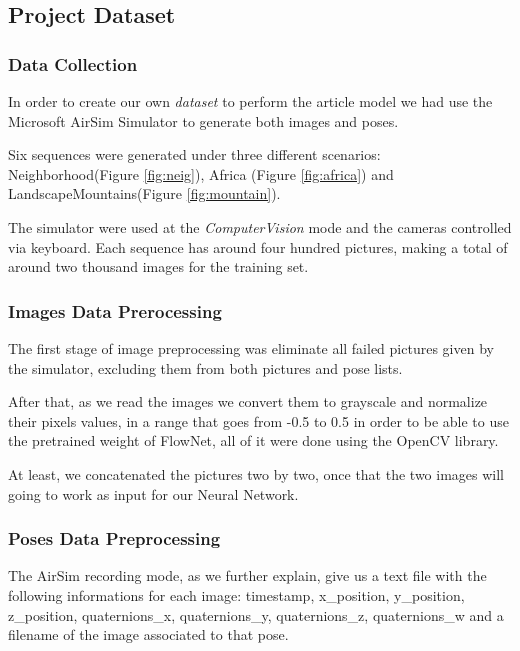     \subsection{Project Dataset}
        \subsubsection{Data Collection}
            In order to create our own \emph{dataset} to perform the article model we had use the Microsoft AirSim Simulator to generate both images and poses.
            
            Six sequences were generated under three different scenarios: Neighborhood(Figure \ref{fig:neig}), Africa (Figure \ref{fig:africa}) and LandscapeMountains(Figure \ref{fig:mountain}). 
            
            The simulator were used at the \emph{ComputerVision} mode and the cameras controlled via keyboard. Each sequence has around four hundred pictures, making a total of around two thousand images for the training set.
        
        \subsubsection{Images Data Prerocessing}
            The first stage of image preprocessing was eliminate all failed pictures given by the simulator, excluding them from both pictures and pose lists.
            
            After that, as we read the images we convert them to grayscale and normalize their pixels values, in a range that goes from -0.5 to 0.5 in order to be able to use the pretrained weight of FlowNet, all of it were done using the OpenCV library.
            
            At least, we concatenated the pictures two by two, once that the two images will going to work as input for our Neural Network.
            
        \subsubsection{Poses Data Preprocessing}
            The AirSim recording mode, as we further explain, give us a text file with the following informations for each image: timestamp, x\_position, y\_position, z\_position, quaternions\_x, quaternions\_y, quaternions\_z, quaternions\_w and a filename of the image associated to that pose.
            
